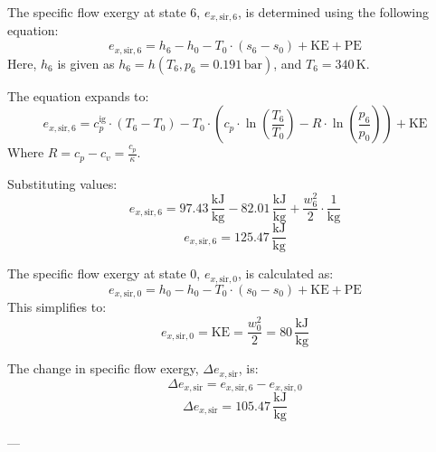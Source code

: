 The specific flow exergy at state 6, \( e_{x,\text{sir},6} \), is determined using the following equation:  
\[
e_{x,\text{sir},6} = h_6 - h_0 - T_0 \cdot (s_6 - s_0) + \text{KE} + \text{PE}
\]  
Here, \( h_6 \) is given as \( h_6 = h(T_6, p_6 = 0.191 \, \text{bar}) \), and \( T_6 = 340 \, \text{K} \).  

The equation expands to:  
\[
e_{x,\text{sir},6} = c_p^{\text{ig}} \cdot (T_6 - T_0) - T_0 \cdot \left( c_p \cdot \ln\left(\frac{T_6}{T_0}\right) - R \cdot \ln\left(\frac{p_6}{p_0}\right) \right) + \text{KE}
\]  
Where \( R = c_p - c_v = \frac{c_p}{\kappa} \).  

Substituting values:  
\[
e_{x,\text{sir},6} = 97.43 \, \frac{\text{kJ}}{\text{kg}} - 82.01 \, \frac{\text{kJ}}{\text{kg}} + \frac{w_6^2}{2} \cdot \frac{1}{\text{kg}}
\]  
\[
e_{x,\text{sir},6} = 125.47 \, \frac{\text{kJ}}{\text{kg}}
\]  

The specific flow exergy at state 0, \( e_{x,\text{sir},0} \), is calculated as:  
\[
e_{x,\text{sir},0} = h_0 - h_0 - T_0 \cdot (s_0 - s_0) + \text{KE} + \text{PE}
\]  
This simplifies to:  
\[
e_{x,\text{sir},0} = \text{KE} = \frac{w_0^2}{2} = 80 \, \frac{\text{kJ}}{\text{kg}}
\]  

The change in specific flow exergy, \( \Delta e_{x,\text{sir}} \), is:  
\[
\Delta e_{x,\text{sir}} = e_{x,\text{sir},6} - e_{x,\text{sir},0}
\]  
\[
\Delta e_{x,\text{sir}} = 105.47 \, \frac{\text{kJ}}{\text{kg}}
\]  

---